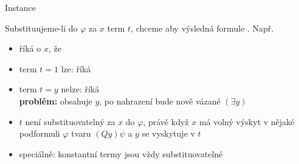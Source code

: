 \documentclass{beamer}
\begin{document}
\begin{frame}{Instance}
    
    Substituujeme-li do $\varphi$ za $x$ term $t$, chceme aby výsledná formule . Např. 
    \begin{itemize}
        \item říká o $x$, že 
        \item term $t=1$ lze:  říká 
        \item term $t=y$ nelze:  říká \\
        \textbf{problém:} obsahuje $y$, po nahrazení bude nově vázané $(\exists y)$
    \end{itemize}
    \begin{itemize}
        \item $t$ \alert{není} substituovatelný za $x$ do $\varphi$, právě když $x$ má volný výskyt v nějaké podformuli $\varphi$ tvaru $(Qy)\psi$ a $y$ se vyskytuje v $t$
        \item speciálně: konstantní termy jsou vždy substituovatelné
    \end{itemize}

\end{frame}
\end{document}
